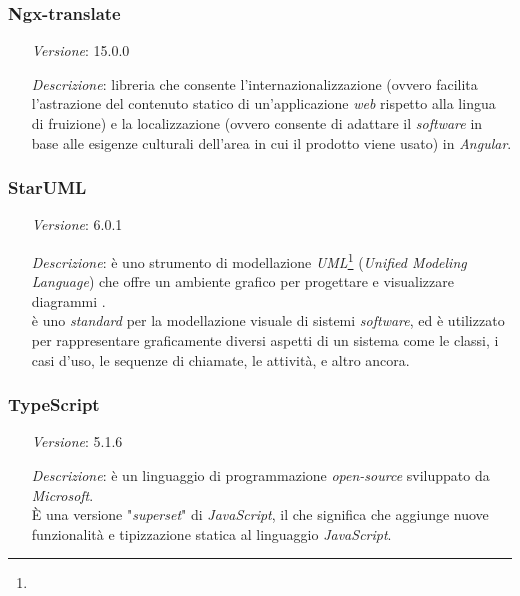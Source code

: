     \subsubsection*{Ngx-translate} %
    \label{subsubsec:ngx}
    \begin{itemize}[align=left]
        \item [\textit{Versione}:] 15.0.0
        \item [\textit{Descrizione}:] libreria che consente l'internazionalizzazione (ovvero facilita l'astrazione del contenuto statico di un'applicazione \textit{web} rispetto alla lingua di fruizione) e la localizzazione (ovvero consente di adattare il \textit{software} in base alle esigenze culturali dell'area in cui il prodotto viene usato) in \textit{Angular}.
    \end{itemize}

    \subsubsection*{StarUML}
    \begin{itemize}[align=left]
        \item [\textit{Versione}:] 6.0.1
        \item [\textit{Descrizione}:] è uno strumento di modellazione \textit{UML}\footnote{} (\textit{Unified Modeling Language}) che offre un ambiente grafico per progettare e visualizzare diagrammi . \\
                 è uno \textit{standard} per la modellazione visuale di sistemi \textit{software}, ed è utilizzato per rappresentare graficamente diversi aspetti di un sistema come le classi, i casi d'uso, le sequenze di chiamate, le attività, e altro ancora.
    \end{itemize}

    \subsubsection*{TypeScript} %
    \begin{itemize}[align=left]
        \item [\textit{Versione}:] 5.1.6
        \item [\textit{Descrizione}:] è un linguaggio di programmazione \textit{open-source} sviluppato da \textit{Microsoft}. \\
                È una versione "\textit{superset}" di \textit{JavaScript}, il che significa che aggiunge nuove funzionalità e tipizzazione statica al linguaggio \textit{JavaScript}.
    \end{itemize}

